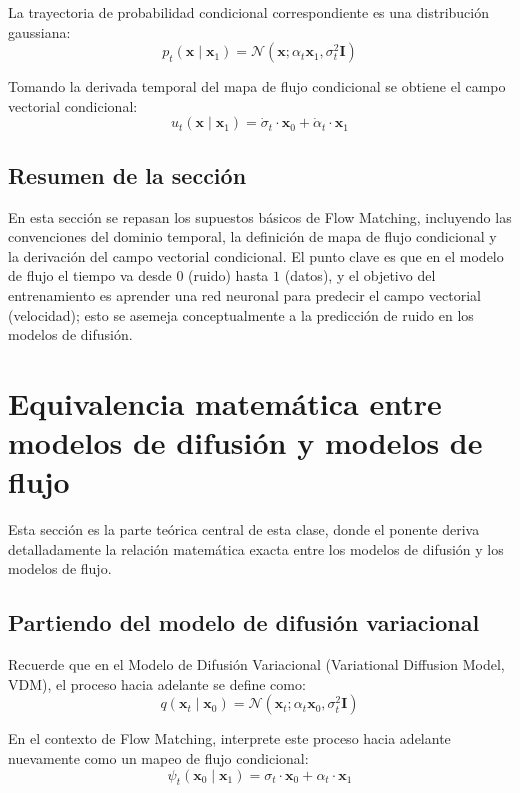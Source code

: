 \documentclass[a4paper]{article}
\begin{document}
La trayectoria de probabilidad condicional correspondiente es una distribución gaussiana:
$$p_t(\mathbf{x} \mid \mathbf{x}_1) = \mathcal{N}(\mathbf{x}; \alpha_t \mathbf{x}_1, \sigma_t^2 \mathbf{I})$$

Tomando la derivada temporal del mapa de flujo condicional se obtiene el campo vectorial condicional:
$$u_t(\mathbf{x} \mid \mathbf{x}_1) = \dot{\sigma}_t \cdot \mathbf{x}_0 + \dot{\alpha}_t \cdot \mathbf{x}_1$$

\subsection{Resumen de la sección}

En esta sección se repasan los supuestos básicos de Flow Matching, incluyendo las convenciones del dominio temporal, la definición de mapa de flujo condicional y la derivación del campo vectorial condicional. El punto clave es que en el modelo de flujo el tiempo va desde $0$ (ruido) hasta $1$ (datos), y el objetivo del entrenamiento es aprender una red neuronal para predecir el campo vectorial (velocidad); esto se asemeja conceptualmente a la predicción de ruido en los modelos de difusión.

\section{Equivalencia matemática entre modelos de difusión y modelos de flujo}

Esta sección es la parte teórica central de esta clase, donde el ponente deriva detalladamente la relación matemática exacta entre los modelos de difusión y los modelos de flujo.

\subsection{Partiendo del modelo de difusión variacional}

Recuerde que en el Modelo de Difusión Variacional (Variational Diffusion Model, VDM), el proceso hacia adelante se define como:
$$q(\mathbf{x}_t \mid \mathbf{x}_0) = \mathcal{N}(\mathbf{x}_t; \alpha_t \mathbf{x}_0, \sigma_t^2 \mathbf{I})$$

En el contexto de Flow Matching, interprete este proceso hacia adelante nuevamente como un mapeo de flujo condicional:
$$\psi_t(\mathbf{x}_0 \mid \mathbf{x}_1) = \sigma_t \cdot \mathbf{x}_0 + \alpha_t \cdot \mathbf{x}_1$$
\end{document}
